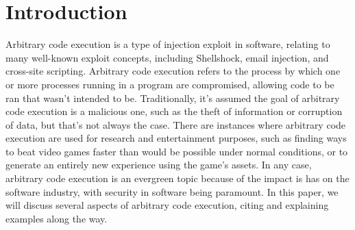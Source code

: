 \section{Introduction}

Arbitrary code execution is a type of injection exploit in software, relating to many well-known exploit concepts, including Shellshock, email injection, and cross-site scripting. Arbitrary code execution refers to the process by which one or more processes running in a program are compromised, allowing code to be ran that wasn't intended to be. Traditionally, it's assumed the goal of arbitrary code execution is a malicious one, such as the theft of information or corruption of data, but that's not always the case. There are instances where arbitrary code execution are used for research and entertainment purposes, such as finding ways to beat video games faster than would be possible under normal conditions, or to generate an entirely new experience using the game's assets. In any case, arbitrary code execution is an evergreen topic because of the impact is has on the software industry, with security in software being paramount. In this paper, we will discuss several aspects of arbitrary code execution, citing and explaining examples along the way.